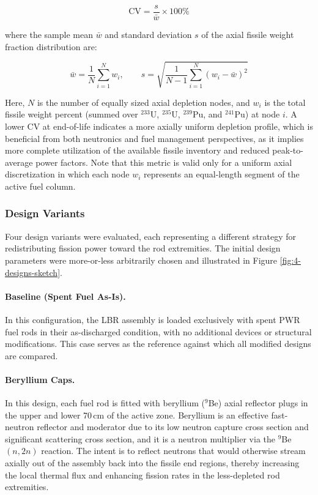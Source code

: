 \begin{equation}
    \text{CV} = \frac{s}{\bar{w}} \times 100\%
    \label{eq:cv}
\end{equation}

\noindent where the sample mean $\bar{w}$ and standard deviation $s$ of the axial fissile weight fraction distribution are:

\begin{equation}
    \bar{w} = \frac{1}{N} \sum_{i=1}^{N} w_i, \qquad
    s = \sqrt{\frac{1}{N-1} \sum_{i=1}^{N} \left(w_i - \bar{w}\right)^2}
    \label{eq:cv_components}
\end{equation}

\noindent Here, $N$ is the number of equally sized axial depletion nodes, and $w_i$ is the total fissile weight percent (summed over $^{233}$U, $^{235}$U, $^{239}${Pu}, and $^{241}$Pu) at node $i$. A lower CV at end-of-life indicates a more axially uniform depletion profile, which is beneficial from both neutronics and fuel management perspectives, as it implies more complete utilization of the available fissile inventory and reduced peak-to-average power factors. Note that this metric is valid only for a uniform axial discretization in which each node $w_i$ represents an equal-length segment of the active fuel column.

\subsubsection{Design Variants}

Four design variants were evaluated, each representing a different strategy for redistributing fission power toward the rod extremities. The initial design parameters were more-or-less arbitrarily chosen and illustrated in Figure \ref{fig:4-designs-sketch}.

\paragraph{Baseline (Spent Fuel As-Is).}
In this configuration, the LBR assembly is loaded exclusively with spent PWR fuel rods in their as-discharged condition, with no additional devices or structural modifications. This case serves as the reference against which all modified designs are compared.

\paragraph{Beryllium Caps.}
In this design, each fuel rod is fitted with beryllium ($^9$Be) axial reflector plugs in the upper and lower 70\,cm of the active zone.
Beryllium is an effective fast-neutron reflector and moderator due to its low neutron capture cross section and significant scattering cross section, and it is a neutron multiplier via the $^9$Be$(n,2n)$ reaction. The intent is to reflect neutrons that would otherwise stream axially out of the assembly back into the fissile end regions, thereby increasing the local thermal flux and enhancing fission rates in the less-depleted rod extremities.

